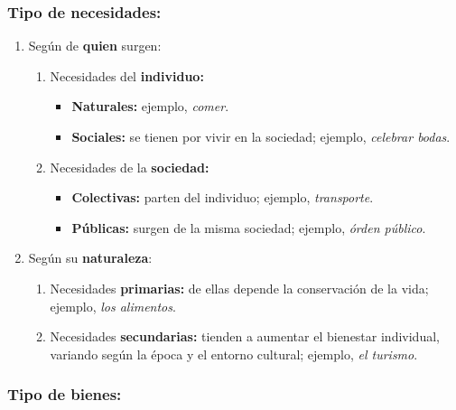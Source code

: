 \documentclass[10pt,a4paper]{article}
\begin{document}
\subsubsection{Tipo de necesidades:}

\begin{enumerate}
\item Según de \textbf{quien} surgen:
\begin{enumerate}
\item Necesidades del \textbf{individuo:}
\begin{itemize}
\item \textbf{Naturales:} ejemplo, \textit{comer}.
\item \textbf{Sociales:} se tienen por vivir en la sociedad; ejemplo, \textit{celebrar bodas}.
\end{itemize}
\item Necesidades de la \textbf{sociedad:}
\begin{itemize}
\item \textbf{Colectivas:} parten del individuo; ejemplo, \textit{transporte}.
\item \textbf{Públicas:} surgen de la misma sociedad; ejemplo, \textit{órden público}.
\end{itemize}
\end{enumerate}
\item Según su \textbf{naturaleza}:
\begin{enumerate}
\item Necesidades \textbf{primarias:} de ellas depende la conservación de la vida; ejemplo, \textit{los alimentos}.
\item Necesidades \textbf{secundarias:} tienden a aumentar el bienestar individual, variando según la época y el entorno cultural; ejemplo, \textit{el turismo}.
\end{enumerate}
\end{enumerate}

\subsubsection{Tipo de bienes:}
\end{document}
